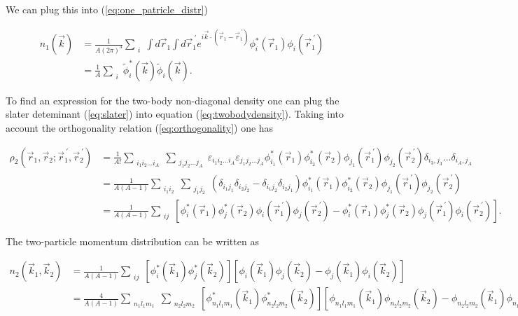 \documentclass[12pt]{article}
\begin{document}
We can plug this into (\ref{eq:one_patricle_distr})

\begin{align} 
	n_1(\vec{k})&=\frac{1}{A(2\pi)^3} \sum_{\substack{i}} \int d\vec{r}_1 \int d\vec{r}_1^{\ \prime} e^{i\vec{k}\cdot (\vec{r}_1-\vec{r}^{\ \prime}_1)}
	\phi^*_i(\vec{r}_1)\phi_i(\vec{r}_1^{\ \prime}) \\
	& = \frac{1}{A} \sum_{\substack{i}} \tilde{\phi}^*_i(\vec{k})\tilde{\phi}_i(\vec{k}).
\end{align}

To find an expression for the two-body non-diagonal density one can plug the slater deteminant (\ref{eq:slater}) into equation (\ref{eq:twobodydensity}). Taking into account the orthogonality relation (\ref{eq:orthogonality}) one has

\begin{align}
\rho_2(\vec{r}_1,\vec{r}_2;\vec{r}^{\ \prime}_1,\vec{r}^{\ \prime}_2) 
&  = \frac{1}{A!} 	 \sum_{\substack{i_1 i_2 \ldots i_A}} \sum_{\substack{j_1j_2 \ldots j_A}} \varepsilon_{i_1 i_2 \ldots i_A} \varepsilon_{j_1j_2 \ldots j_A} \phi^*_{i_1}(\vec{r}_1)\phi^*_{i_2}(\vec{r}_2) \phi_{j_1}(\vec{r}_1^{\ \prime})\phi_{j_2}(\vec{r}_2^{\ \prime})
\delta_{i_3,j_3}...\delta_{i_A,j_A} \\
&  = \frac{1}{A(A-1)} 	 \sum_{\substack{i_1 i_2}} \sum_{\substack{j_1j_2}} \left(\delta_{i_1j_1}\delta_{i_2j_2} - \delta_{i_1j_2}\delta_{i_2j_1} \right)
\phi^*_{i_1}(\vec{r}_1)\phi^*_{i_2}(\vec{r}_2) \phi_{j_1}(\vec{r}_1^{\ \prime})\phi_{j_2}(\vec{r}_2^{\ \prime}) \\
& = \frac{1}{A(A-1)}\sum_{\substack{i j}} \left[\phi^*_{i}(\vec{r}_1)\phi^*_{j}(\vec{r}_2) \phi_{i}(\vec{r}_1^{\ \prime})\phi_{j}(\vec{r}_2^{\ \prime})  - \phi^*_{i}(\vec{r}_1)\phi^*_{j}(\vec{r}_2) \phi_{j}(\vec{r}_1^{\ \prime})\phi_{i}(\vec{r}_2^{\ \prime}) \right].
\end{align}

The two-particle momentum distribution can be written as

\begin{align}
n_2(\vec{k}_1,\vec{k}_2) & = \frac{1}{A(A-1)}\sum_{\substack{i j}} \left[\phi^*_{i}(\vec{k}_1)\phi^*_{j}(\vec{k}_2) \right] \left[ \phi_{i}(\vec{k}_1)\phi_{j}(\vec{k}_2)  - \phi_{j}(\vec{k}_1)\phi_{i}(\vec{k}_2) \right]\\
& = \frac{4}{A(A-1)}\sum_{\substack{n_1l_1m_1}} \sum_{\substack{n_2l_2m_2}}\left[\phi^*_{n_1l_1m_1}(\vec{k}_1)\phi^*_{n_2l_2m_2}(\vec{k}_2) \right] \left[ \phi_{n_1l_1m_1}(\vec{k}_1)\phi_{n_2l_2m_2}(\vec{k}_2)  - \phi_{n_2l_2m_2}(\vec{k}_1)\phi_{n_1l_1m_1}(\vec{k}_2) \right] 
\end{align}
\end{document}
